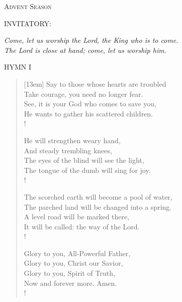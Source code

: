 \begin{center}\noindent\textsc{\small{Advent Season\\}}\end{center}
\small{\uppercase{Invitatory:}}\normalsize
\begin{center}
\textit{Come, let us worship the Lord, the King who is to come.\\}
\textit{The Lord is close at hand; come, let us worship him.\\}
\end{center}
\label{advent:firstHymn}
\small{\uppercase{Hymn I}}\normalsize
\begin{verse}[13em]
Say to those whose hearts are troubled\\
Take courage, you need no longer fear.\\
See, it is your God who comes to save you,\\
He wants to gather his scattered children.\\!

He will strengthen weary hand,\\
And steady trembling knees,\\
The eyes of the blind will see the light,\\
The tongue of the dumb will sing for joy.\\!

The scorched earth will become a pool of water,\\
The parched land will be changed into a spring.\\
A level road will be marked there,\\
It will be called: the way of the Lord.\\!

Glory to you, All-Powerful Father,\\
Glory to you, Christ our Savior,\\
Glory to you, Spirit of Truth,\\
Now and forever more. Amen.\\!
\end{verse}

